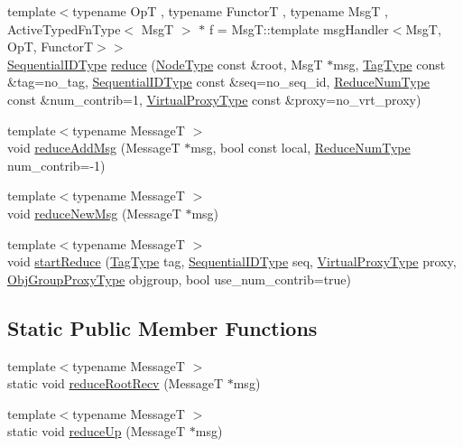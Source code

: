 \begin{DoxyCompactItemize}
\item 
{\footnotesize template$<$typename OpT , typename FunctorT , typename MsgT , Active\+Typed\+Fn\+Type$<$ Msg\+T $>$ $\ast$ f = Msg\+T\+::template msg\+Handler$<$\+Msg\+T, Op\+T, Functor\+T$>$$>$ }\\\hyperlink{namespacevt_a3063d4db3b879d6dd2c7b8d50995c7f6}{Sequential\+I\+D\+Type} \hyperlink{structvt_1_1collective_1_1reduce_1_1_reduce_a526a8c10de0a179deca4f1a6961ec636}{reduce} (\hyperlink{namespacevt_a866da9d0efc19c0a1ce79e9e492f47e2}{Node\+Type} const \&root, MsgT $\ast$msg, \hyperlink{namespacevt_a84ab281dae04a52a4b243d6bf62d0e52}{Tag\+Type} const \&tag=no\+\_\+tag, \hyperlink{namespacevt_a3063d4db3b879d6dd2c7b8d50995c7f6}{Sequential\+I\+D\+Type} const \&seq=no\+\_\+seq\+\_\+id, \hyperlink{structvt_1_1collective_1_1reduce_1_1_reduce_a6fd4d5e956ac5acd321e57c7dad5131f}{Reduce\+Num\+Type} const \&num\+\_\+contrib=1, \hyperlink{namespacevt_a1b417dd5d684f045bb58a0ede70045ac}{Virtual\+Proxy\+Type} const \&proxy=no\+\_\+vrt\+\_\+proxy)
\item 
{\footnotesize template$<$typename MessageT $>$ }\\void \hyperlink{structvt_1_1collective_1_1reduce_1_1_reduce_aea636ae0bba63982be6a0ca5622750fe}{reduce\+Add\+Msg} (MessageT $\ast$msg, bool const local, \hyperlink{structvt_1_1collective_1_1reduce_1_1_reduce_a6fd4d5e956ac5acd321e57c7dad5131f}{Reduce\+Num\+Type} num\+\_\+contrib=-\/1)
\item 
{\footnotesize template$<$typename MessageT $>$ }\\void \hyperlink{structvt_1_1collective_1_1reduce_1_1_reduce_a43961733967e6e9f89eb5ad25fc7c44b}{reduce\+New\+Msg} (MessageT $\ast$msg)
\item 
{\footnotesize template$<$typename MessageT $>$ }\\void \hyperlink{structvt_1_1collective_1_1reduce_1_1_reduce_af3346be7ab8528e9bc7fe85ac75854f6}{start\+Reduce} (\hyperlink{namespacevt_a84ab281dae04a52a4b243d6bf62d0e52}{Tag\+Type} tag, \hyperlink{namespacevt_a3063d4db3b879d6dd2c7b8d50995c7f6}{Sequential\+I\+D\+Type} seq, \hyperlink{namespacevt_a1b417dd5d684f045bb58a0ede70045ac}{Virtual\+Proxy\+Type} proxy, \hyperlink{namespacevt_ad7cae989df485fccca57f0792a880a8e}{Obj\+Group\+Proxy\+Type} objgroup, bool use\+\_\+num\+\_\+contrib=true)
\end{DoxyCompactItemize}
\subsection*{Static Public Member Functions}
\begin{DoxyCompactItemize}
\item 
{\footnotesize template$<$typename MessageT $>$ }\\static void \hyperlink{structvt_1_1collective_1_1reduce_1_1_reduce_a0d711251f8c9bcf804d91ae29d1006f2}{reduce\+Root\+Recv} (MessageT $\ast$msg)
\item 
{\footnotesize template$<$typename MessageT $>$ }\\static void \hyperlink{structvt_1_1collective_1_1reduce_1_1_reduce_ac9efb121d6c94a0b8781846c284aaea1}{reduce\+Up} (MessageT $\ast$msg)
\end{DoxyCompactItemize}


